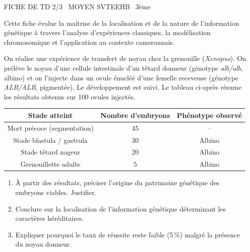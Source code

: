 \documentclass[11pt]{article}
\begin{document}
\begin{tcolorbox}[enhanced,colback=popink,colframe=popink,arc=10pt,boxrule=0pt,left=12pt,right=12pt,top=9pt,bottom=9pt]
{\color{white}\popxbold\small FICHE DE TD 2/3 \textbullet\ MOYEN \hfill SVTEEHB \textbullet\ 3ème\par}
\end{tcolorbox}
\vspace{4pt}
Cette fiche évalue la maîtrise de la localisation et de la nature de l'information génétique à travers l'analyse d'expériences classiques, la modélisation chromosomique et l'application au contexte camerounais.

\begin{exercice}
On réalise une expérience de transfert de noyau chez la grenouille (\textit{Xenopus}). On prélève le noyau d'une cellule intestinale d'un têtard donneur (génotype \textit{alb/alb}, albino) et on l'injecte dans un ovule énucléé d'une femelle receveuse (génotype \textit{ALB/ALB}, pigmentée). Le développement est suivi. Le tableau ci-après résume les résultats obtenus sur 100 ovules injectés.

\begin{center}
\begin{tabular}{|c|c|c|}
\hline
\textbf{Stade atteint} & \textbf{Nombre d'embryons} & \textbf{Phénotype observé} \\
\hline
Mort précoce (segmentation) & 45 & -- \\
\hline
Stade blastula / gastrula & 30 & Albino \\
\hline
Stade têtard nageur & 20 & Albino \\
\hline
Grenouillette adulte & 5 & Albino \\
\hline
\end{tabular}
\end{center}

\begin{enumerate}
\item À partir des résultats, préciser l'origine du patrimoine génétique des embryons viables. Justifier.
\item Conclure sur la localisation de l'information génétique déterminant les caractères héréditaires.
\item Expliquer pourquoi le taux de réussite reste faible (5\,\%) malgré la présence du noyau donneur.
\end{enumerate}
\end{exercice}
\end{document}
